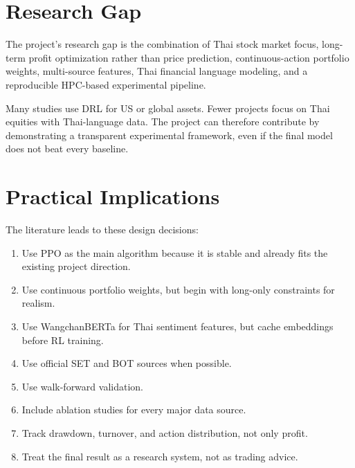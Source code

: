 \documentclass[11pt]{article}
\begin{document}
\section{Research Gap}
The project's research gap is the combination of Thai stock market focus, long-term profit optimization rather than price prediction, continuous-action portfolio weights, multi-source features, Thai financial language modeling, and a reproducible HPC-based experimental pipeline.

Many studies use DRL for US or global assets. Fewer projects focus on Thai equities with Thai-language data. The project can therefore contribute by demonstrating a transparent experimental framework, even if the final model does not beat every baseline.

\section{Practical Implications}
The literature leads to these design decisions:
\begin{enumerate}
\item Use PPO as the main algorithm because it is stable and already fits the existing project direction.
\item Use continuous portfolio weights, but begin with long-only constraints for realism.
\item Use WangchanBERTa for Thai sentiment features, but cache embeddings before RL training.
\item Use official SET and BOT sources when possible.
\item Use walk-forward validation.
\item Include ablation studies for every major data source.
\item Track drawdown, turnover, and action distribution, not only profit.
\item Treat the final result as a research system, not as trading advice.
\end{enumerate}
\end{document}
